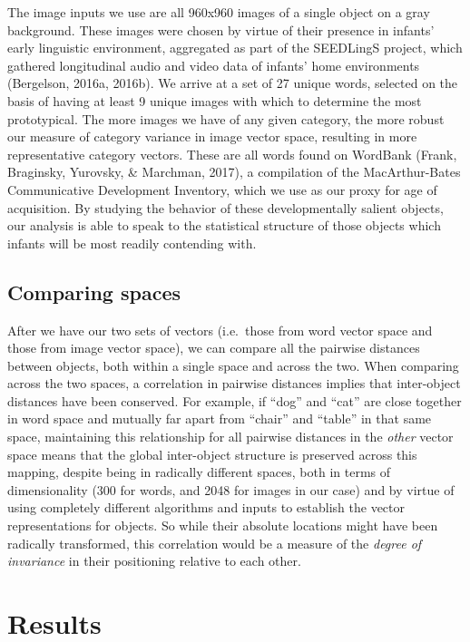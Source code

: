 \documentclass[10pt, letterpaper]{article}
\begin{document}
The image inputs we use are all 960x960 images of a single object on a
gray background. These images were chosen by virtue of their presence in
infants' early linguistic environment, aggregated as part of the
SEEDLingS project, which gathered longitudinal audio and video data of
infants' home environments (Bergelson, 2016a, 2016b). We arrive at a set
of 27 unique words, selected on the basis of having at least 9 unique
images with which to determine the most prototypical. The more images we
have of any given category, the more robust our measure of category
variance in image vector space, resulting in more representative
category vectors. These are all words found on WordBank (Frank,
Braginsky, Yurovsky, \& Marchman, 2017), a compilation of the
MacArthur-Bates Communicative Development Inventory, which we use as our
proxy for age of acquisition. By studying the behavior of these
developmentally salient objects, our analysis is able to speak to the
statistical structure of those objects which infants will be most
readily contending with.

\subsection{Comparing spaces}\label{comparing-spaces}

After we have our two sets of vectors (i.e.~those from word vector space
and those from image vector space), we can compare all the pairwise
distances between objects, both within a single space and across the
two. When comparing across the two spaces, a correlation in pairwise
distances implies that inter-object distances have been conserved. For
example, if ``dog'' and ``cat'' are close together in word space and
mutually far apart from ``chair'' and ``table'' in that same space,
maintaining this relationship for all pairwise distances in the
\textit{other} vector space means that the global inter-object structure
is preserved across this mapping, despite being in radically different
spaces, both in terms of dimensionality (300 for words, and 2048 for
images in our case) and by virtue of using completely different
algorithms and inputs to establish the vector representations for
objects. So while their absolute locations might have been radically
transformed, this correlation would be a measure of the
\textit{degree of invariance} in their positioning relative to each
other.

\section{Results}\label{results}
\end{document}
